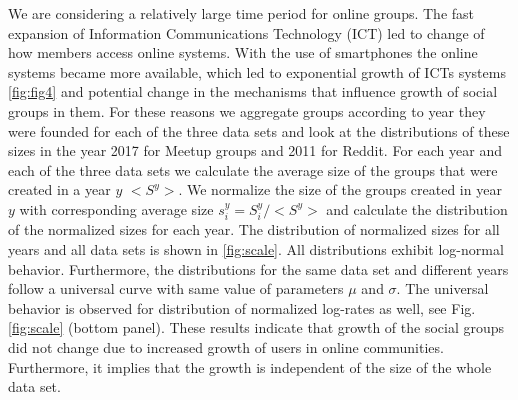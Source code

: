 We are considering a relatively large time period for online groups. The fast expansion of Information Communications Technology (ICT) led to change of how members access online systems. With the use of smartphones the online systems became more available, which led to exponential growth of ICTs systems \ref{fig:fig4} and potential change in the mechanisms that influence growth of social groups in them. For these reasons we aggregate groups according to year they were founded for each of the three data sets and look at the distributions of these sizes in the year 2017 for Meetup groups and 2011 for Reddit. For each year and each of the three data sets we calculate the average size of the groups that were created in a year $y$ $<S^{y}>$. We normalize the size of the groups created in year $y$ with corresponding average size $s^{y}_{i}=S^{y}_{i}/<S^{y}>$ and calculate the distribution of the normalized sizes for each year. The distribution of normalized sizes for all years and all data sets is shown in \ref{fig:scale}. All distributions exhibit log-normal behavior. Furthermore, the distributions for the same data set and different years follow a universal curve with same value of parameters $\mu$ and $\sigma$. The universal behavior is observed for distribution of normalized log-rates as well, see Fig. \ref{fig:scale} (bottom panel). These results indicate that growth of the social groups did not change due to increased growth of users in online communities. Furthermore, it implies that the growth is independent of the size of the whole data set.   









